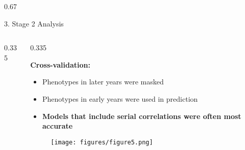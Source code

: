 \documentclass[final]{beamer}
\newlength{\twocolwid}
\begin{document}
\begin{frame}[t]
\begin{columns}[t]
\begin{column}{\twocolwid}
\begin{columns}[t,totalwidth=\twocolwid]
\begin{column}{0.67\twocolwid}
\begin{block}{3. Stage 2 Analysis}
\begin{columns}[t,totalwidth=0.67\twocolwid]
\begin{column}{0.335\twocolwid}
%
%
%



\end{column}


\begin{column}{0.335\twocolwid}
\vspace{-2cm}


\begin{footnotesize}

\textbf{Cross-validation:}

\begin{itemize}
  \item{Phenotypes in later years were masked}
  \item{Phenotypes in early years were used in prediction}
  \item{\textbf{Models that include serial correlations were often most accurate}}
\end{itemize}

\begin{center}
  \begin{figure}
    \texttt{[image: figures/figure5.png]}
  \end{figure}
\end{center}


\end{footnotesize}



\end{column}
\end{columns}
\end{block}
\end{column}
\end{columns}
\end{column}
\end{columns}
\end{frame}
\end{document}

